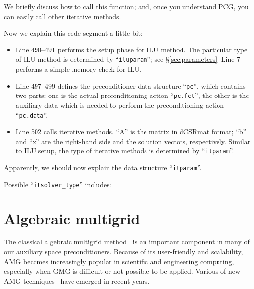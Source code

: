 \documentclass[11pt]{memoir}
\begin{document}
We briefly discuss how to call this function; and, once you understand PCG, you can easily call other iterative methods.
%

%
Now we explain this code segment a little bit:
\begin{itemize}
\item Line 490--491 performs the setup phase for ILU method. The particular type of ILU method is determined by ``\verb|iluparam|''; see \S\ref{sec:parameters}. Line 7 performs a simple memory check for ILU.
\item Line 497--499 defines the preconditioner data structure ``\verb|pc|'', which contains two parts: one is the actual preconditioning action ``\verb|pc.fct|'', the other is the auxiliary data which is needed to perform the preconditioning action ``\verb|pc.data|''.
\item Line 502 calls iterative methods. ``A'' is the matrix in dCSRmat format; ``b'' and ``x'' are the right-hand side and the solution vectors, respectively. Similar to ILU setup, the type of iterative methods is determined by ``\verb|itparam|''.
\end{itemize}

Apparently, we should now explain the data structure ``\verb|itparam|''.
%

%
Possible ``\verb|itsolver_type|'' includes:
%

%

\section{Algebraic multigrid}\label{sec:amg}

The classical algebraic multigrid method~\cite{Ruge.RugeStuben.1987bs} is an important component in many of our auxiliary space preconditioners. Because of its user-friendly and scalability, AMG becomes increasingly popular in scientific and engineering computing, especially when GMG is difficult or not possible to be applied. Various of new AMG techniques~\cite{Vanek.VanekMandel.1996kl,Wan.WanChan.2000qa,Brezina.BrezinaCleary.2000ly,Henson.HensonVassilevski.2001cr,Chartier.ChartierFalgout.2003ve,Livne.Livne.2004kl,Falgout.FalgoutVassilevski.2004bh,Xu.XuZikatanov.2004pi,Brannick.BrannickZikatanov.2007zr,Muresan.MuresanNotay.2008tg, Hu.X;Vassilevski.P;Xu.J.2013a} have emerged in recent years.
\end{document}

